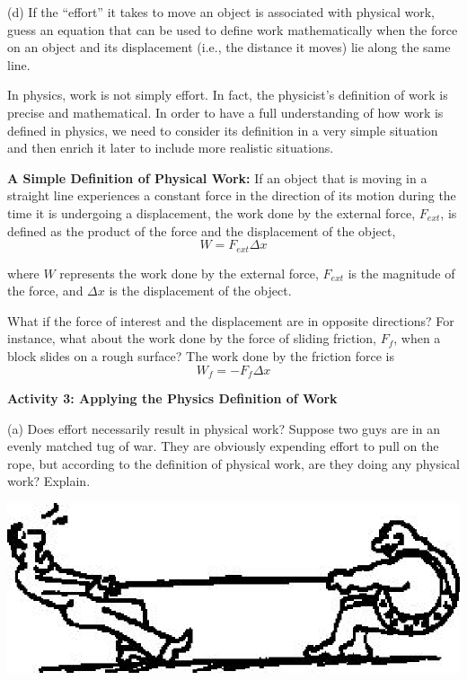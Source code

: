 (d) If the ``effort'' it takes to move an object is associated
with physical work, guess an equation that can be used to define work mathematically
when the force on an object and its displacement (i.e., the distance it moves)
lie along the same line.
\vspace{20mm}

In physics, work is not simply effort. In fact, the physicist's definition of
work is precise and mathematical. In order to have a full understanding of how
work is defined in physics, we need to consider its definition in a very simple
situation and then enrich it later to include more realistic situations.

\textbf{A Simple Definition of Physical Work:} If an object that is moving in
a straight line experiences a constant force in the direction of its motion
during the time it is undergoing a displacement, the work done by the external
force, \( F_{ext} \), is defined as the product of the force and the displacement of the object, 
\[
W=F_{ext}\Delta x\]


where $W$ represents the work done by the external force, \( F_{ext} \) is the
magnitude of the force, and \( \Delta  x\) is the displacement of the object.

What if the force of interest and the displacement are in opposite directions? For instance, what about the work done by the force of sliding friction,
\( F_{f} \), when a block slides on a rough surface? The work done by the friction force is
\[
W_{f}=-F_{f}\Delta x\]

\textbf{Activity 3: Applying the Physics Definition of Work} 

(a) Does effort necessarily result in physical work? Suppose two guys are in
an evenly matched tug of war. They are obviously expending effort to pull on the
rope, but according to the definition of physical work, are they doing any physical
work? Explain.

\vspace{0.3cm}
{\par\centering \includegraphics{work_power/work_power_fig3.eps} \par}
\vspace{0.3cm}

